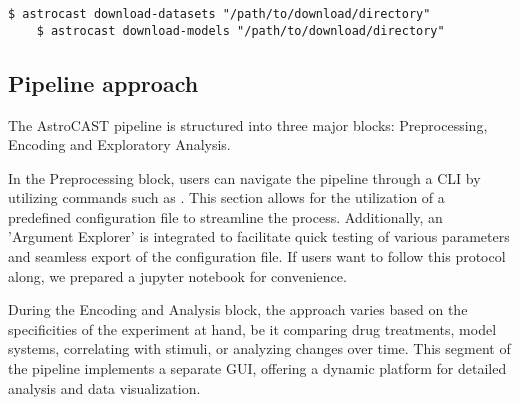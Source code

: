 \begin{lstlisting}[style=bashStyle]
    $ astrocast download-datasets "/path/to/download/directory"
    $ astrocast download-models "/path/to/download/directory"
\end{lstlisting}

\subsection{Pipeline approach}
The AstroCAST pipeline is structured into three major blocks: Preprocessing, Encoding and Exploratory Analysis.

In the Preprocessing block, users can navigate the pipeline through a \ac{CLI} by utilizing commands such as . This section allows for the utilization of a predefined configuration file to streamline the process. Additionally, an 'Argument Explorer' is integrated to facilitate quick testing of various parameters and seamless export of the configuration file. If users want to follow this protocol along, we prepared a jupyter notebook for convenience.

During the Encoding and Analysis block, the approach varies based on the specificities of the experiment at hand, be it comparing drug treatments, model systems, correlating with stimuli, or analyzing changes over time. This segment of the pipeline implements a separate GUI, offering a dynamic platform for detailed analysis and data visualization.
